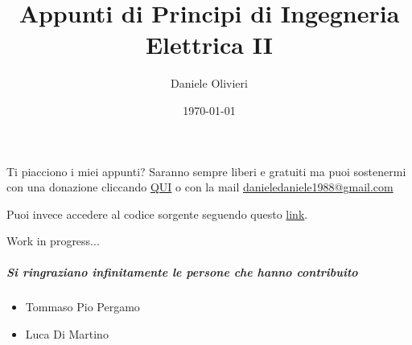\documentclass[a4paper,11pt]{scrartcl}
\title{Appunti di Principi di Ingegneria Elettrica II}
\author{Daniele Olivieri}
\date{\today}
\begin{document}
\maketitle
Ti piacciono i miei appunti? Saranno sempre liberi e gratuiti ma puoi sostenermi con una donazione cliccando \href{https://www.paypal.com/donate?hosted_button_id=7KELP768NJSYW}{QUI} o con la mail \href{https://paypal.me/FlashNoob98}{danieledaniele1988@gmail.com}

Puoi invece accedere al codice sorgente seguendo questo \href{https://github.com/FlashNoob98/appunti_principi_II_unina}{link}.
\setcounter{tocdepth}{2}
\tableofcontents
\setlength\arrayrulewidth{1.2pt} %

































%
Work in progress...
\subparagraph{Si ringraziano infinitamente le persone che hanno contribuito}
\begin{itemize}
\item Tommaso Pio Pergamo
\item Luca Di Martino
\end{itemize}
\end{document}
